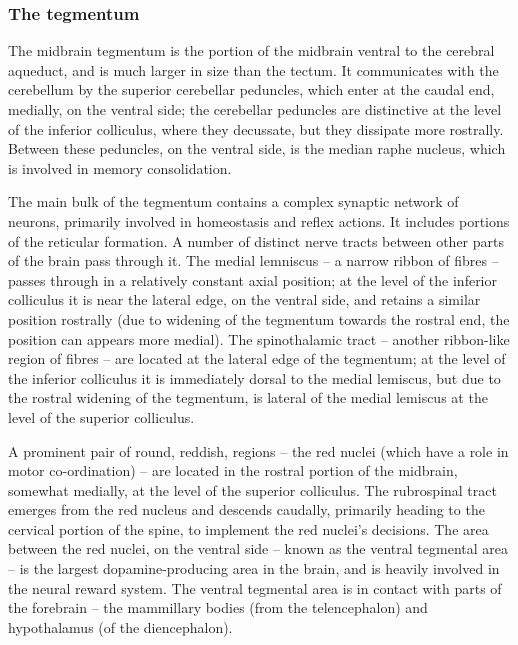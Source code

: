 \hypertarget{the-tegmentum}{%
\subsubsection{The tegmentum}\label{the-tegmentum}}

The midbrain tegmentum is the portion of the midbrain ventral to the cerebral aqueduct, and is much larger in size than the tectum. It communicates with the cerebellum by the superior cerebellar peduncles, which enter at the caudal end, medially, on the ventral side; the cerebellar peduncles are distinctive at the level of the inferior colliculus, where they decussate, but they dissipate more rostrally. Between these peduncles, on the ventral side, is the median raphe nucleus, which is involved in memory consolidation.

The main bulk of the tegmentum contains a complex synaptic network of neurons, primarily involved in homeostasis and reflex actions. It includes portions of the reticular formation. A number of distinct nerve tracts between other parts of the brain pass through it. The medial lemniscus -- a narrow ribbon of fibres -- passes through in a relatively constant axial position; at the level of the inferior colliculus it is near the lateral edge, on the ventral side, and retains a similar position rostrally (due to widening of the tegmentum towards the rostral end, the position can appears more medial). The spinothalamic tract -- another ribbon-like region of fibres -- are located at the lateral edge of the tegmentum; at the level of the inferior colliculus it is immediately dorsal to the medial lemiscus, but due to the rostral widening of the tegmentum, is lateral of the medial lemiscus at the level of the superior colliculus.

A prominent pair of round, reddish, regions -- the red nuclei (which have a role in motor co-ordination) -- are located in the rostral portion of the midbrain, somewhat medially, at the level of the superior colliculus. The rubrospinal tract emerges from the red nucleus and descends caudally, primarily heading to the cervical portion of the spine, to implement the red nuclei's decisions. The area between the red nuclei, on the ventral side -- known as the ventral tegmental area -- is the largest dopamine-producing area in the brain, and is heavily involved in the neural reward system. The ventral tegmental area is in contact with parts of the forebrain -- the mammillary bodies (from the telencephalon) and hypothalamus (of the diencephalon).

